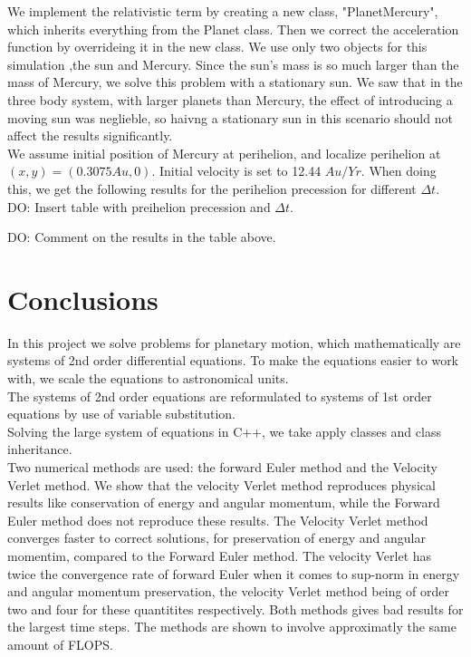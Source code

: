 \documentclass{article}
\begin{document}
We implement the relativistic term by creating a new class, "PlanetMercury", which inherits everything from the Planet class. Then we correct the acceleration function by overrideing it in the new class. We use only two objects for this simulation ,the sun and Mercury. Since the sun's mass is so much larger than the mass of Mercury, we solve this problem with a stationary sun. We saw that in the three body system, with larger planets than Mercury, the effect of introducing a moving sun was neglieble, so haivng a stationary sun in this scenario should not affect the results significantly. \\

We assume initial position of Mercury at perihelion, and localize perihelion at $(x,y) = (0.3075 Au, 0)$. Initial velocity is set to 12.44 $Au/Yr$. When doing this, we get the following results for the perihelion precession for different $\Delta t$.\\

DO: Insert table with preihelion precession and $\Delta t$.

DO: Comment on the results in the table above. 


\section{Conclusions}
In this project we solve problems for planetary motion, which mathematically are systems of 2nd order differential equations. To make the equations easier to work with, we scale the equations to astronomical units.\\

The systems of 2nd order equations are reformulated to systems of 1st order equations by use of variable substitution. \\

Solving the large system of equations in C++, we take apply classes and class inheritance.\\

Two numerical methods are used: the forward Euler method and the Velocity Verlet method. We show that the velocity Verlet method reproduces physical results like conservation of energy and angular momentum, while the Forward Euler method does not reproduce these results. The Velocity Verlet method converges faster to correct solutions, for preservation of energy and angular momentim, compared to the Forward Euler method. The velocity Verlet has twice the convergence rate of forward Euler when it comes to sup-norm in energy and angular momentum preservation, the velocity Verlet method being of order two and four for these quantitites respectively. Both methods gives bad results for the largest time steps. The methods are shown to involve approximatly the same amount of FLOPS.\\
\end{document}
